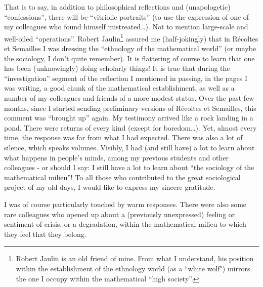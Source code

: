 That is to say, in addition to philosophical reflections and (unapologetic) ``confessions'', 
there will be ``vitriolic portraits'' (to use the expression of one of my
colleagues who found himself mistreated\ldots). 
Not to mention large-scale and well-oiled ``operations''.
Robert Jaulin\footnote{Robert Jaulin is an old friend of mine. From what I understand, his position within the establishment of the ethnology world (as a ``white wolf") mirrors the one I occupy within the mathematical ``high society''.} assured me (half-jokingly) that in 
R\'ecoltes et Semailles I was dressing the ``ethnology
of the mathematical world'' (or maybe the sociology, I don't quite remember).
It is flattering of course to learn
that one has been (unknowingly) doing scholarly things!
It is true that during the ``investigation'' segment of the reflection I mentioned in passing,
in the pages I was writing, a good chunk of the mathematical establishment,
as well as a number of my colleagues and friends of a more modest status.
Over the past few months, since I started sending preliminary versions of
R\'ecoltes et Semailles, 
this comment was ``brought up'' again. My testimony arrived like a rock landing in a pond. 
There were returns of every kind (except for boredom\ldots). 
Yet, almost every time, the response was far from what I had expected. 
There was also a lot of silence, which speaks volumes. 
Visibly, I had (and still have) a lot to learn about what happens in people's minds, among
my previous students and other colleagues - or should I say: I still have a lot to learn about ``the sociology of the mathematical milieu''!
To all those who contributed to the great sociological project of my old days, I would like
to express my sincere gratitude.

I was of course particularly touched by warm responses. There were also some rare
colleagues who opened up about a (previously unexpressed) feeling or sentiment of crisis, or a 
degradation, within the mathematical milieu to which they feel that they belong. 

